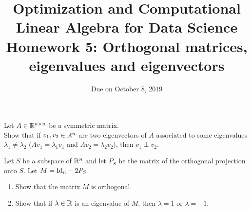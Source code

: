 \documentclass[11pt,nocut]{article}
\title{\vspace{-2.0cm}%
	Optimization and Computational Linear Algebra for Data Science\\
Homework 5: Orthogonal matrices, eigenvalues and eigenvectors}
\date{\vspace{-1cm}Due on October 8, 2019}
\begin{document}
\maketitle


\begin{problem}[2 points]
	Let $A \in \mathbb{R}^{n \times n}$ be a symmetric matrix.
	\\
	Show that if $v_1, v_2 \in \mathbb{R}^n$ are two eigenvectors of $A$ associated to some eigenvalues $\lambda_1 \neq \lambda_2$ ($Av_1 = \lambda_1 v_1$ and $Av_2 = \lambda_2 v_2$), then $v_1 \perp v_2$.
\end{problem}

\vspace{1mm}

\begin{problem}[3 points]
	Let $S$ be a subspace of $\mathbb{R}^n$ and let $P_S$ be the matrix of the orthogonal projection onto $S$. Let $M = {{\rm Id}}_n - 2 P_S$.
	\begin{enumerate}[label=\normalfont(\textbf{\alph*})]
		\item Show that the matrix $M$ is orthogonal.
		\item Show that if $\lambda \in \mathbb{R}$ is an eigenvalue of $M$, then $\lambda = 1$ or $\lambda=-1$.
	\end{enumerate}
\end{problem}

\vspace{1mm}


\end{document}
